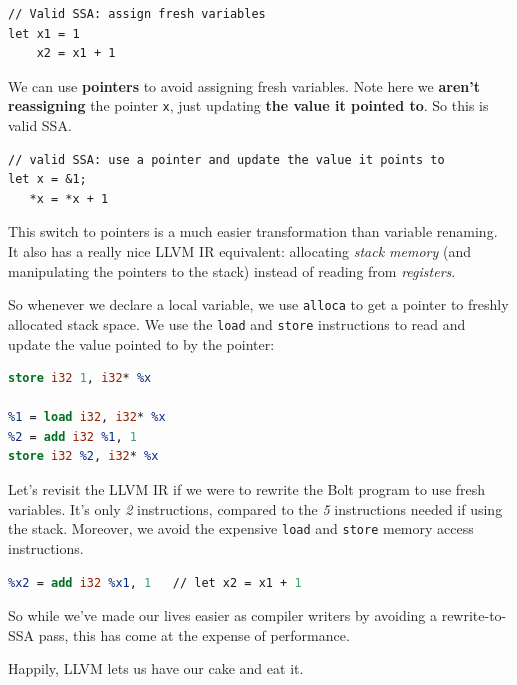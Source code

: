 

\begin{verbatim}
// Valid SSA: assign fresh variables
let x1 = 1
    x2 = x1 + 1
\end{verbatim}

We can use \textbf{pointers} to avoid assigning fresh variables. Note
here we \textbf{aren't reassigning} the pointer \texttt{x}, just
updating \textbf{the value it pointed to}. So this is valid SSA.


\begin{verbatim}
// valid SSA: use a pointer and update the value it points to
let x = &1;
   *x = *x + 1
\end{verbatim}

This switch to pointers is a much easier transformation than variable
renaming. It also has a really nice LLVM IR equivalent: allocating
\emph{stack memory} (and manipulating the pointers to the stack) instead
of reading from \emph{registers}.

So whenever we declare a local variable, we use \texttt{alloca} to get a
pointer to freshly allocated stack space. We use the \texttt{load} and
\texttt{store} instructions to read and update the value pointed to by
the pointer:

%

\begin{lstlisting}[language=llvm]
%x = alloca i32
store i32 1, i32* %x

%1 = load i32, i32* %x
%2 = add i32 %1, 1
store i32 %2, i32* %x
\end{lstlisting}

Let's revisit the LLVM IR if we were to rewrite the Bolt program to use
fresh variables. It's only \emph{2} instructions, compared to the
\emph{5} instructions needed if using the stack. Moreover, we avoid the
expensive \texttt{load} and \texttt{store} memory access instructions.

%

\begin{lstlisting}[language=llvm]
%x1 = 1
%x2 = add i32 %x1, 1   // let x2 = x1 + 1
\end{lstlisting}

So while we've made our lives easier as compiler writers by avoiding a
rewrite-to-SSA pass, this has come at the expense of performance.

Happily, LLVM lets us have our cake and eat it.


